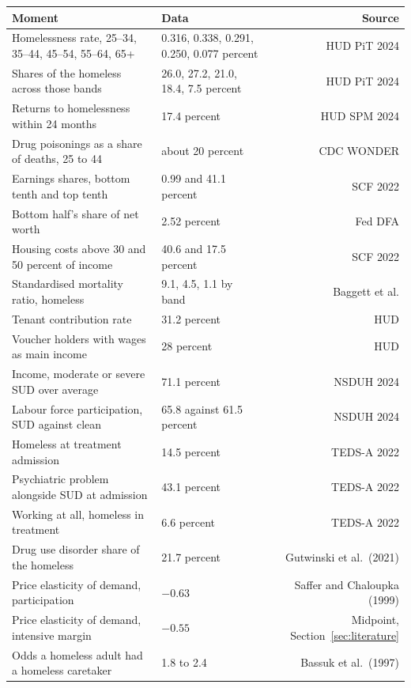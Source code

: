 \documentclass[10pt]{article}
\begin{document}
\begin{center}\footnotesize\setlength{\tabcolsep}{4pt}
\begin{tabular}{@{}llr@{}}
\toprule
Moment & Data & Source \\
\midrule
Homelessness rate, 25--34, 35--44, 45--54, 55--64, 65+
 & 0.316, 0.338, 0.291, 0.250, 0.077 percent & HUD PiT 2024 \\
Shares of the homeless across those bands
 & 26.0, 27.2, 21.0, 18.4, 7.5 percent & HUD PiT 2024 \\
Returns to homelessness within 24 months & 17.4 percent & HUD SPM 2024 \\
Drug poisonings as a share of deaths, 25 to 44 & about 20 percent & CDC WONDER \\
Earnings shares, bottom tenth and top tenth & 0.99 and 41.1 percent & SCF 2022 \\
Bottom half's share of net worth & 2.52 percent & Fed DFA \\
Housing costs above 30 and 50 percent of income & 40.6 and 17.5 percent & SCF 2022 \\
Standardised mortality ratio, homeless & 9.1, 4.5, 1.1 by band & Baggett et al. \\
Tenant contribution rate & 31.2 percent & HUD \\
Voucher holders with wages as main income & 28 percent & HUD \\
Income, moderate or severe SUD over average & 71.1 percent & NSDUH 2024 \\
Labour force participation, SUD against clean & 65.8 against 61.5 percent & NSDUH 2024 \\
Homeless at treatment admission & 14.5 percent & TEDS-A 2022 \\
Psychiatric problem alongside SUD at admission & 43.1 percent & TEDS-A 2022 \\
Working at all, homeless in treatment & 6.6 percent & TEDS-A 2022 \\
Drug use disorder share of the homeless & 21.7 percent & Gutwinski et al.\ (2021) \\
Price elasticity of demand, participation & $-0.63$ & Saffer and Chaloupka (1999) \\
Price elasticity of demand, intensive margin & $-0.55$ & Midpoint, Section~\ref{sec:literature} \\
Odds a homeless adult had a homeless caretaker & 1.8 to 2.4 & Bassuk et al.\ (1997) \\
\bottomrule
\end{tabular}
\end{center}
\end{document}
